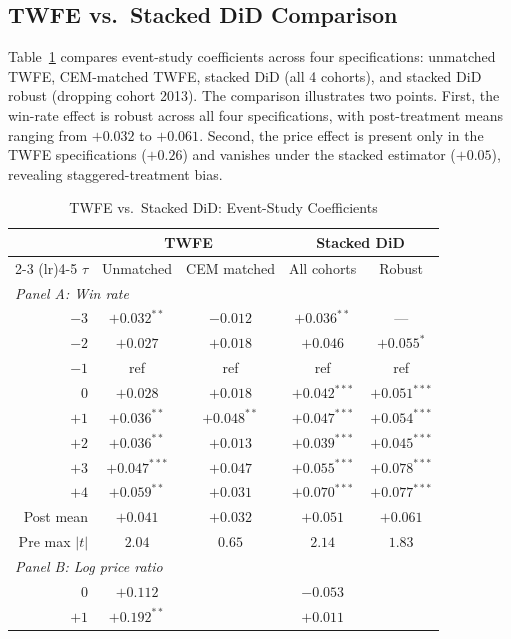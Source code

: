 \subsection{TWFE vs.\ Stacked DiD Comparison}\label{app:twfe}

Table~\ref{tab:twfe_vs_stacked} compares event-study coefficients across four specifications: unmatched TWFE, CEM-matched TWFE, stacked DiD (all 4 cohorts), and stacked DiD robust (dropping cohort 2013). The comparison illustrates two points. First, the win-rate effect is robust across all four specifications, with post-treatment means ranging from $+0.032$ to $+0.061$. Second, the price effect is present only in the TWFE specifications ($+0.26$) and vanishes under the stacked estimator ($+0.05$), revealing staggered-treatment bias.

\begin{table}[htbp]
\centering
\caption{TWFE vs.\ Stacked DiD: Event-Study Coefficients}\label{tab:twfe_vs_stacked}
\begin{tabular}{rcccc}
\toprule
& \multicolumn{2}{c}{TWFE} & \multicolumn{2}{c}{Stacked DiD} \\
\cmidrule(lr){2-3} \cmidrule(lr){4-5}
$\tau$ & Unmatched & CEM matched & All cohorts & Robust \\
\midrule
\multicolumn{5}{l}{\emph{Panel A: Win rate}} \\[3pt]
$-3$ & $+0.032^{**}$ & $-0.012$ & $+0.036^{**}$ & --- \\
$-2$ & $+0.027$ & $+0.018$ & $+0.046$ & $+0.055^{*}$ \\
$-1$ & ref & ref & ref & ref \\
$0$ & $+0.028$ & $+0.018$ & $+0.042^{***}$ & $+0.051^{***}$ \\
$+1$ & $+0.036^{**}$ & $+0.048^{**}$ & $+0.047^{***}$ & $+0.054^{***}$ \\
$+2$ & $+0.036^{**}$ & $+0.013$ & $+0.039^{***}$ & $+0.045^{***}$ \\
$+3$ & $+0.047^{***}$ & $+0.047$ & $+0.055^{***}$ & $+0.078^{***}$ \\
$+4$ & $+0.059^{**}$ & $+0.031$ & $+0.070^{***}$ & $+0.077^{***}$ \\[3pt]
Post mean & $+0.041$ & $+0.032$ & $+0.051$ & $+0.061$ \\
Pre max $|t|$ & $2.04$ & $0.65$ & $2.14$ & $1.83$ \\[8pt]
\multicolumn{5}{l}{\emph{Panel B: Log price ratio}} \\[3pt]
$0$ & $+0.112$ & & $-0.053$ & \\
$+1$ & $+0.192^{**}$ & & $+0.011$ & \\

\end{tabular}
\end{table}
